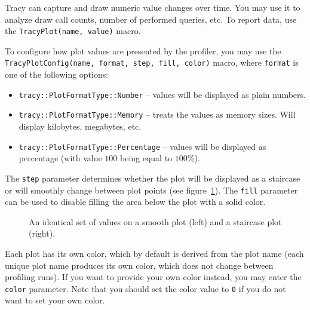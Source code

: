 \documentclass[hidelinks,titlepage,a4paper,twoside]{article}
\begin{document}
Tracy can capture and draw numeric value changes over time. You may use it to analyze draw call counts, number of performed queries, etc. To report data, use the \texttt{TracyPlot(name, value)} macro.

To configure how plot values are presented by the profiler, you may use the \texttt{TracyPlotConfig(name, format, step, fill, color)} macro, where \texttt{format} is one of the following options:

\begin{itemize}
\item \texttt{tracy::PlotFormatType::Number} -- values will be displayed as plain numbers.
\item \texttt{tracy::PlotFormatType::Memory} -- treats the values as memory sizes. Will display kilobytes, megabytes, etc.
\item \texttt{tracy::PlotFormatType::Percentage} -- values will be displayed as percentage (with value $100$ being equal to $100\%$).
\end{itemize}

The \texttt{step} parameter determines whether the plot will be displayed as a staircase or will smoothly change between plot points (see figure~\ref{plotconfig}). The \texttt{fill} parameter can be used to disable filling the area below the plot with a solid color.

\begin{figure}[h]
\centering{}
\caption{An identical set of values on a smooth plot (left) and a staircase plot (right).}
\label{plotconfig}
\end{figure}

Each plot has its own color, which by default is derived from the plot name (each unique plot name produces its own color, which does not change between profiling runs). If you want to provide your own color instead, you may enter the \texttt{color} parameter. Note that you should set the color value to \texttt{0} if you do not want to set your own color.
\end{document}
